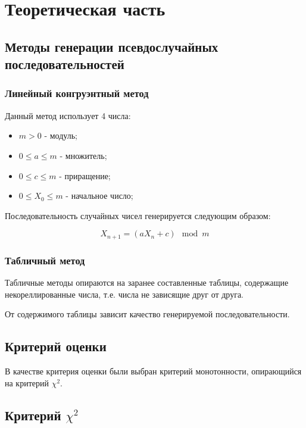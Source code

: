 \chapter{Теоретическая часть}

\section{Методы генерации псевдослучайных последовательностей}

\subsection{Линейный конгруэнтный метод}

Данный метод использует 4 числа:

\begin{itemize}
    \item $m > 0$ - модуль;
    \item $0 \le a \le m$ - множитель;
    \item $0 \le c \le m$ - приращение;
    \item $0 \le X_0 \le m$ - начальное число;
\end{itemize}

Последовательность случайных чисел генерируется следующим образом:

\begin{equation}
    X_{n+1} = (a X_n + c) \mod m
\end{equation}

\subsection{Табличный метод}

Табличные методы опираются на заранее составленные таблицы, содержащие некореллированные числа, т.е. числа не зависящие друг от друга.

От содержимого таблицы зависит качество генерируемой последовательности.

\section{Критерий оценки}

В качестве критерия оценки были выбран критерий монотонности, опирающийся на критерий \(\chi^2\).

\section{Критерий \(\chi^2\)}

